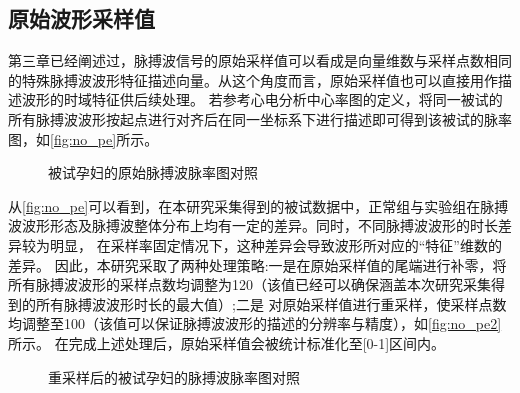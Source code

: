 \subsection{原始波形采样值}

第三章已经阐述过，脉搏波信号的原始采样值可以看成是向量维数与采样点数相同的特殊脉搏波波形特征描述向量。从这个角度而言，原始采样值也可以直接用作描述波形的时域特征供后续处理。
若参考心电分析中心率图的定义，将同一被试的所有脉搏波波形按起点进行对齐后在同一坐标系下进行描述即可得到该被试的脉率图，如\autoref{fig:no_pe}所示。
\begin{figure}[htbp]
      \centering
      \quad
      \quad
      \quad
      \caption{\label{fig:no_pe}被试孕妇的原始脉搏波脉率图对照}
\end{figure}

从\autoref{fig:no_pe}可以看到，在本研究采集得到的被试数据中，正常组与实验组在脉搏波波形形态及脉搏波整体分布上均有一定的差异。同时，不同脉搏波波形的时长差异较为明显，
在采样率固定情况下，这种差异会导致波形所对应的“特征”维数的差异。
因此，本研究采取了两种处理策略:一是在原始采样值的尾端进行补零，将所有脉搏波波形的采样点数均调整为120（该值已经可以确保涵盖本次研究采集得到的所有脉搏波波形时长的最大值）;二是
对原始采样值进行重采样，使采样点数均调整至100（该值可以保证脉搏波波形的描述的分辨率与精度），如\autoref{fig:no_pe2}所示。
在完成上述处理后，原始采样值会被统计标准化至[0-1]区间内。

\begin{figure}[htbp]
      \centering
      \quad
      \quad
      \quad
      \caption{\label{fig:no_pe2}重采样后的被试孕妇的脉搏波脉率图对照}
\end{figure}

